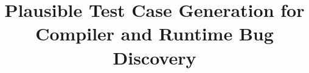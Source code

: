 



\title{Plausible Test Case Generation for Compiler and Runtime Bug Discovery}

\maketitle















\printbibliography

